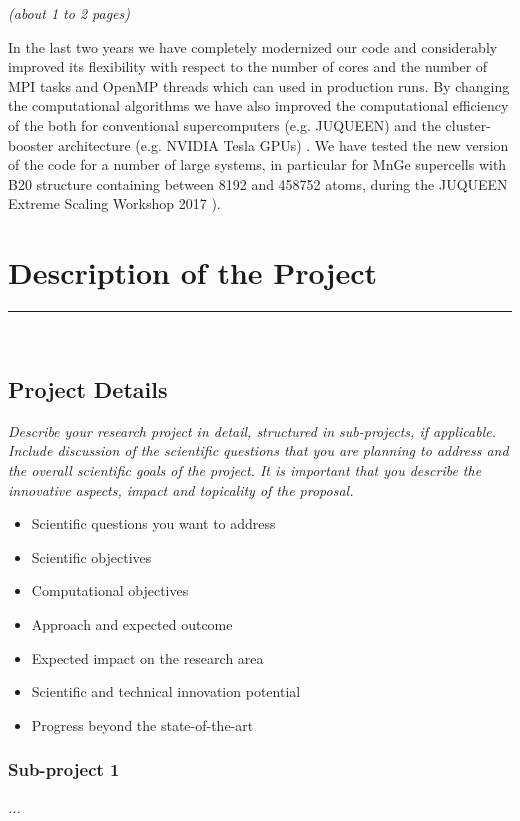 \documentclass [a4paper, 12pt]{article}
\begin{document}
\textit{(about 1 to 2 pages)}


In the last two years we have completely modernized our code and considerably improved 
its flexibility with respect to the number of cores and the number of MPI tasks and
OpenMP threads which can used in production runs. By changing the computational algorithms
we have also improved the computational efficiency of the both for conventional
supercomputers (e.g. JUQUEEN) and the cluster-booster architecture
(e.g. NVIDIA Tesla GPUs) \cite{dutot_addressing_2016}. 
We have tested the new version of the code for a number of large systems, 
in particular for MnGe supercells with B20 structure containing between 8192 and 458752 atoms,
during the JUQUEEN Extreme Scaling Workshop 2017 \cite{brommel_juqueen_2017}). 

\section{Description of the Project}
\rule{\textwidth}{0.4pt}\\
\subsection{Project Details}
\textit{Describe your research project in detail, structured in sub-projects, if applicable. Include discussion of the scientific questions that you are planning to address and the overall scientific goals of the project. It is important that you describe the innovative aspects, impact and topicality of the proposal.}
\begin{itshape}
\begin{itemize}\setlength{\itemsep}{-2pt}
  \item Scientific questions you want to address
  \item Scientific objectives
  \item Computational objectives
  \item Approach and expected outcome
  \item Expected impact on the research area
  \item Scientific and technical innovation potential
  \item Progress beyond the state-of-the-art
\end{itemize}
\end{itshape}

\subsubsection{Sub-project 1}
\textit{...}
\end{document}
